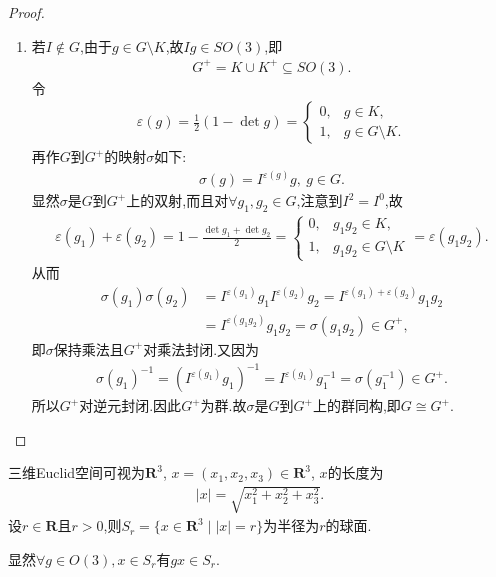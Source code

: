 \documentclass[../../main.tex]{subfiles}%
\begin{document}
\begin{proof}
\begin{enumerate}[(1)]
\item 若$I \notin G$,由于$g \in G \setminus K$,故$Ig \in SO(3)$,即
\begin{align*}
G^+=K \cup K^+ \subseteq SO(3).
\end{align*}
令
\begin{align*}
\varepsilon(g)=\frac{1}{2}(1-\det g)=
\begin{cases}
0, & g \in K, \\
1, & g \in G \setminus K.
\end{cases}
\end{align*}
再作$G$到$G^+$的映射$\sigma$如下:
\begin{align*}
\sigma(g)=I^{\varepsilon(g)}g,\ g \in G.
\end{align*}
显然$\sigma$是$G$到$G^+$上的双射,而且对$\forall g_1,g_2\in G$,注意到$I^2=I^0$,故
\begin{align*}
\varepsilon(g_1)+\varepsilon(g_2) = 1-\frac{\det g_1+\det g_2}{2}=\begin{cases}
0, & g_1g_2 \in K, \\
1, & g_1g_2 \in G \setminus K
\end{cases}=\varepsilon(g_1g_2).
\end{align*}
从而
\begin{align*}
\sigma(g_1)\sigma(g_2)&=I^{\varepsilon(g_1)}g_1I^{\varepsilon(g_2)}g_2=I^{\varepsilon(g_1)+\varepsilon(g_2)}g_1g_2 \\
&=I^{\varepsilon(g_1g_2)}g_1g_2=\sigma(g_1g_2)\in G^+,
\end{align*}
即$\sigma$保持乘法且$G^+$对乘法封闭.又因为
\begin{align*}
\sigma \left( g_1 \right) ^{-1}=\left( I^{\varepsilon \left( g_1 \right)}g_1 \right) ^{-1}=I^{\varepsilon \left( g_1 \right)}g_{1}^{-1}=\sigma \left( g_{1}^{-1} \right) \in G^+.
\end{align*}
所以$G^+$对逆元封闭.因此$G^+$为群.故$\sigma$是$G$到$G^+$上的群同构,即$G \cong G^+$.
\end{enumerate}

\end{proof}

\begin{definition}
三维Euclid空间可视为$\mathbf{R}^3$, $x=(x_1,x_2,x_3) \in \mathbf{R}^3$, $x$的长度为
\begin{align*}
|x|=\sqrt{x_1^2+x_2^2+x_3^2}.
\end{align*}
设$r \in \mathbf{R}$且$r>0$,则$S_r=\{x \in \mathbf{R}^3\mid |x|=r\}$为半径为$r$的球面.
\end{definition}
\begin{remark}
显然$\forall g \in O(3), x \in S_r$有$gx \in S_r$.
\end{remark}
\end{document}
